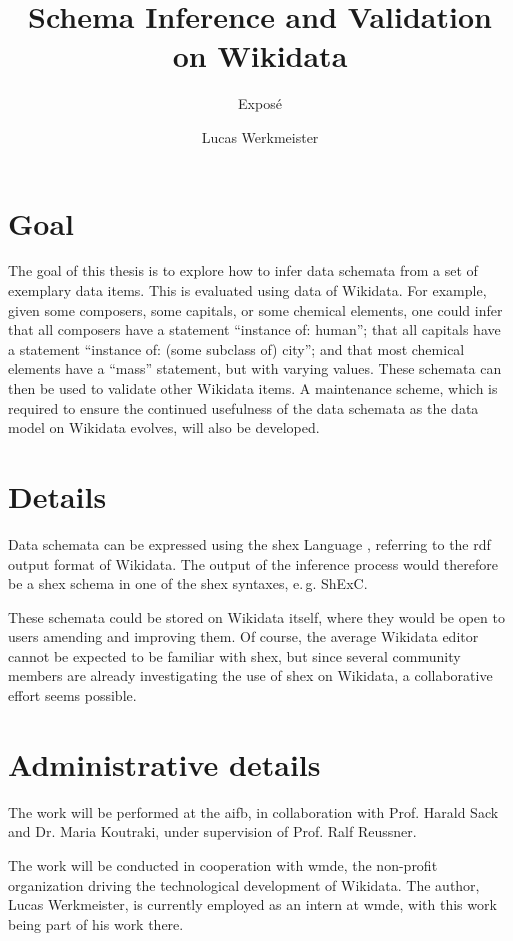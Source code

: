 \documentclass{scrartcl}
\title{Schema Inference and Validation on Wikidata}
\subtitle{Exposé}
\author{Lucas Werkmeister}
\begin{document}
\maketitle

\section{Goal}

The goal of this thesis is to explore how to infer data schemata from a set of exemplary data items.
This is evaluated using data of Wikidata.
For example, given some composers, some capitals, or some chemical elements,
one could infer that all composers have a statement “instance of: human”;
that all capitals have a statement “instance of: (some subclass of) city”;
and that most chemical elements have a “mass” statement, but with varying values.
These schemata can then be used to validate other Wikidata items.
A maintenance scheme,
which is required to ensure the continued usefulness of the data schemata
as the data model on Wikidata evolves,
will also be developed.

\section{Details}

Data schemata can be expressed using the \gls{shex} Language \cite{Prud'hommeaux:2014:SER:2660517.2660523},
referring to the \gls{rdf} output format of Wikidata.
The output of the inference process would therefore be a \gls{shex} schema in one of the \gls{shex} syntaxes, e.\,g. ShExC.

These schemata could be stored on Wikidata itself,
where they would be open to users amending and improving them.
Of course, the average Wikidata editor cannot be expected to be familiar with \gls{shex},
but since several community members are already investigating the use of \gls{shex} on Wikidata,
a collaborative effort seems possible.

\section{Administrative details}

The work will be performed at the \gls{aifb},
in collaboration with Prof. Harald Sack and Dr. Maria Koutraki,
under supervision of Prof. Ralf Reussner.

The work will be conducted in cooperation with \gls{wmde},
the non-profit organization driving the technological development of Wikidata.
The author, Lucas Werkmeister, is currently employed as an intern at \gls{wmde},
with this work being part of his work there.
\end{document}

